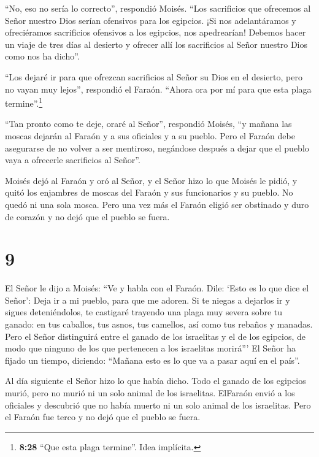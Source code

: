 ``No, eso no sería lo correcto'', respondió Moisés. ``Los
sacrificios que ofrecemos al Señor nuestro Dios serían ofensivos para
los egipcios. ¡Si nos adelantáramos y ofreciéramos sacrificios ofensivos
a los egipcios, nos apedrearían!  Debemos hacer un viaje de
tres días al desierto y ofrecer allí los sacrificios al Señor nuestro
Dios como nos ha dicho''.

 ``Los dejaré ir para que ofrezcan sacrificios al Señor su
Dios en el desierto, pero no vayan muy lejos'', respondió el Faraón.
``Ahora ora por mí para que esta plaga termine''.\footnote{\textbf{8:28}
  ``Que esta plaga termine''. Idea implícita.}

 ``Tan pronto como te deje, oraré al Señor'', respondió
Moisés, ``y mañana las moscas dejarán al Faraón y a sus oficiales y a su
pueblo. Pero el Faraón debe asegurarse de no volver a ser mentiroso,
negándose después a dejar que el pueblo vaya a ofrecerle sacrificios al
Señor''.

 Moisés dejó al Faraón y oró al Señor,  y el
Señor hizo lo que Moisés le pidió, y quitó los enjambres de moscas del
Faraón y sus funcionarios y su pueblo. No quedó ni una sola mosca.
 Pero una vez más el Faraón eligió ser obstinado y duro de
corazón y no dejó que el pueblo se fuera.

\hypertarget{section-8}{%
\section{9}\label{section-8}}

 El Señor le dijo a Moisés: ``Ve y habla con el Faraón.
Dile: `Esto es lo que dice el Señor': Deja ir a mi pueblo, para que me
adoren.  Si te niegas a dejarlos ir y sigues deteniéndolos,
 te castigaré trayendo una plaga muy severa sobre tu ganado:
en tus caballos, tus asnos, tus camellos, así como tus rebaños y
manadas.  Pero el Señor distinguirá entre el ganado de los
israelitas y el de los egipcios, de modo que ninguno de los que
pertenecen a los israelitas morirá'''  El Señor ha fijado un
tiempo, diciendo: ``Mañana esto es lo que va a pasar aquí en el país''.

 Al día siguiente el Señor hizo lo que había dicho. Todo el
ganado de los egipcios murió, pero no murió ni un solo animal de los
israelitas.  ElFaraón envió a los oficiales y descubrió que
no había muerto ni un solo animal de los israelitas. Pero el Faraón fue
terco y no dejó que el pueblo se fuera.


